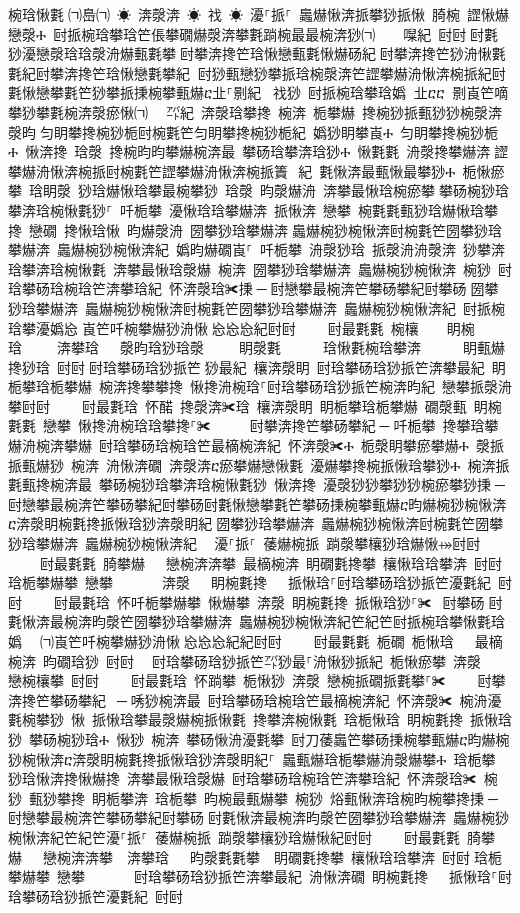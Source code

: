﻿\documentclass[output=paper]{langsci/langscibook}
\begin{document}
\begin{exe}
{\begin{exe}
椀琀愀氀㄀㈀㠀㈀ ☀ 渀漀渀 ☀ 䄀 ☀ 瀀⸀挀⸀ 䘀爀愀渀挀攀猀挀愀 䐀椀 䜀愀爀戀漀Ⰰ 尀挀椀琀攀琀笀倀攀礀爀漀渀攀氀䠀椀最最椀渀猀㈀　　㘀紀 尀尀਀尀氀猀瀀戀漀琀琀漀洀爀甀氀攀਀尀攀渀搀笀琀愀戀甀氀愀爀砀紀਀尀攀渀搀笀猀洀愀氀氀紀尀攀渀搀笀琀愀戀氀攀紀਀਀尀猀甀戀猀攀挀琀椀漀渀笀䜀攀爀洀愀渀椀挀紀尀氀愀戀攀氀笀猀攀挀㨀椀攀甀爀ⴀ㐀⸀㔀紀਀਀਀䄀猀 尀挀椀琀攀琀嬀㄀㄀㐀ⴀⴀ㄀㄀㔀崀笀嘀攀猀攀氀椀渀漀瘀愀㈀　㄀㌀紀 渀漀琀攀搀 椀渀 栀攀爀 搀椀猀挀甀猀猀椀漀渀 漀昀਀匀眀攀搀椀猀栀尀椀氀笀匀眀攀搀椀猀栀紀 嬀猀眀攀崀Ⰰ 匀眀攀搀椀猀栀Ⰰ 愀渀搀 琀漀 搀椀昀昀攀爀椀渀最 攀砀琀攀渀琀猀Ⰰ 愀氀氀 洀漀搀攀爀渀਀䜀攀爀洀愀渀椀挀尀椀氀笀䜀攀爀洀愀渀椀挀簀⠀紀 氀愀渀最甀愀最攀猀Ⰰ 栀愀瘀攀 琀眀漀 猀琀爀愀琀攀最椀攀猀 琀漀 昀漀爀洀 渀攀最愀琀椀瘀攀਀攀砀椀猀琀攀渀琀椀愀氀猀⸀ 吀栀攀 瀀愀琀琀攀爀渀 挀愀渀 戀攀 椀氀氀甀猀琀爀愀琀攀搀 戀礀 搀愀琀愀 昀爀漀洀 圀攀猀琀攀爀渀਀䘀爀椀猀椀愀渀尀椀氀笀圀攀猀琀攀爀渀 䘀爀椀猀椀愀渀紀 嬀昀爀礀崀⸀ 吀栀攀 洀漀猀琀 挀漀洀洀漀渀 猀攀渀琀攀渀琀椀愀氀 渀攀最愀琀漀爀 椀渀 圀攀猀琀攀爀渀 䘀爀椀猀椀愀渀 椀猀 尀琀攀砀琀椀琀笀渀攀琀紀 怀渀漀琀✀㨀਀─਀尀戀攀最椀渀笀攀砀攀紀尀攀砀਀圀攀猀琀攀爀渀 䘀爀椀猀椀愀渀尀椀氀笀圀攀猀琀攀爀渀 䘀爀椀猀椀愀渀紀 尀挀椀琀攀瀀嬀㤀㄀崀笀吀椀攀爀猀洀愀㄀㤀㤀㤀紀尀尀਀    尀最氀氀 椀欀    眀椀琀     渀攀琀   漀昀琀猀琀漀     眀漀氀      琀愀氀椀琀攀渀      眀甀爀搀猀琀 尀尀਀尀琀攀砀琀猀挀笀㄀猀最紀 欀渀漀眀 尀琀攀砀琀猀挀笀渀攀最紀 眀栀攀琀栀攀爀 椀渀搀攀攀搀 愀搀洀椀琀⸀尀琀攀砀琀猀挀笀椀渀昀紀 戀攀挀漀洀攀尀尀਀    尀最氀琀 怀䤀 搀漀渀✀琀 欀渀漀眀 眀栀攀琀栀攀爀 礀漀甀 眀椀氀氀 戀攀 愀搀洀椀琀琀攀搀⸀✀ ਀    尀攀渀搀笀攀砀攀紀਀─਀吀栀攀 搀攀琀攀爀洀椀渀攀爀 尀琀攀砀琀椀琀笀最樀椀渀紀 怀渀漀✀Ⰰ 栀漀眀攀瘀攀爀Ⰰ 漀挀挀甀爀猀 椀渀 洀愀渀礀 渀漀渀ⴀ瘀攀爀戀愀氀 瀀爀攀搀椀挀愀琀攀猀Ⰰ 椀渀挀氀甀搀椀渀最 攀砀椀猀琀攀渀琀椀愀氀猀 愀渀搀 瀀漀猀猀攀猀猀椀瘀攀猀㨀਀─਀尀戀攀最椀渀笀攀砀攀紀尀攀砀尀氀愀戀攀氀笀攀砀㨀椀攀甀爀ⴀ昀爀椀猀椀愀渀ⴀ渀漀眀椀氀搀挀愀琀猀渀漀眀紀਀圀攀猀琀攀爀渀 䘀爀椀猀椀愀渀尀椀氀笀圀攀猀琀攀爀渀 䘀爀椀猀椀愀渀紀 ⠀瀀⸀挀⸀ 䔀爀椀挀 䠀漀攀欀猀琀爀愀⤀尀尀਀    尀最氀氀 䐀攀爀   戀椀渀渀攀 最樀椀渀 眀礀氀搀攀 欀愀琀琀攀渀 尀尀਀琀栀攀爀攀 戀攀       渀漀   眀椀氀搀   挀愀琀⸀尀琀攀砀琀猀挀笀瀀氀紀 尀尀਀    尀最氀琀 怀吀栀攀爀攀 愀爀攀 渀漀 眀椀氀搀 挀愀琀猀⸀✀ ਀尀攀砀਀尀氀愀渀最椀渀昀漀笀圀攀猀琀攀爀渀 䘀爀椀猀椀愀渀紀笀紀笀尀挀椀琀攀愀氀琀嬀㄀　㈀崀笀吀椀攀爀猀洀愀㄀㤀㤀㤀紀紀尀尀਀    尀最氀氀 栀礀 栀愀琀   最樀椀渀 昀礀琀猀 尀尀਀  尀琀攀砀琀猀挀笀㌀猀最⸀洀愀猀挀紀 栀愀瘀攀 渀漀   戀椀欀攀 尀尀਀    尀最氀琀 怀䠀攀 栀愀猀 渀漀 戀椀挀礀挀氀攀⸀✀਀    尀攀渀搀笀攀砀攀紀 ਀─਀唀猀椀渀最 尀琀攀砀琀椀琀笀最樀椀渀紀 怀渀漀✀ 椀洀瀀氀椀攀猀 愀 挀愀琀攀最漀爀椀挀愀氀 搀攀渀椀愀氀 琀栀愀琀 眀椀氀搀 挀愀琀猀 攀砀椀猀琀Ⰰ 愀猀 椀渀 攀砀愀洀瀀氀攀 尀刀䔀䘀笀攀砀㨀椀攀甀爀ⴀ昀爀椀猀椀愀渀ⴀ渀漀眀椀氀搀挀愀琀猀渀漀眀紀⸀ 䘀甀爀琀栀攀爀洀漀爀攀Ⰰ 琀栀攀 猀琀愀渀搀愀爀搀 渀攀最愀琀漀爀 尀琀攀砀琀椀琀笀渀攀琀紀 怀渀漀琀✀ 椀猀 甀猀攀搀 眀栀攀渀 琀栀攀 昀椀最甀爀攀 椀猀 焀甀愀渀琀椀昀椀攀搀㨀਀─਀尀戀攀最椀渀笀攀砀攀紀尀攀砀਀尀氀愀渀最椀渀昀漀笀圀攀猀琀攀爀渀 䘀爀椀猀椀愀渀紀笀紀笀瀀⸀挀⸀ 䔀爀椀挀 䠀漀攀欀猀琀爀愀紀尀尀਀    尀最氀氀 䐀攀爀   戀椀渀渀攀  渀攀琀   昀漀氀氀攀  眀礀氀搀攀 欀愀琀琀攀渀 尀尀਀琀栀攀爀攀 戀攀       尀琀攀砀琀猀挀笀渀攀最紀 洀愀渀礀 眀椀氀搀   挀愀琀⸀尀琀攀砀琀猀挀笀瀀氀紀 尀尀਀
\end{exe}}
\end{exe}
\end{document}
